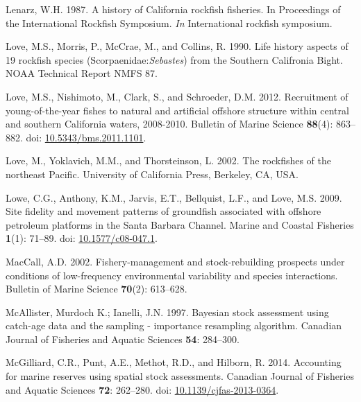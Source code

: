 \documentclass[
  english,
  a4paper,
]{article}
\newlength{\cslhangindent}
\newlength{\cslentryspacingunit} %
\newenvironment{CSLReferences}[2] %
 {%
  \setlength{\parindent}{0pt}
  \ifodd #1
  \let\oldpar\par
  \def\par{\hangindent=\cslhangindent\oldpar}
  \fi
  \setlength{\parskip}{#2\cslentryspacingunit}
 }%
 {}
\begin{document}
\begin{CSLReferences}{1}{0}
\leavevmode{}%
Lenarz, W.H. 1987. {A history of California rockfish fisheries. In Proceedings of the International Rockfish Symposium.} \emph{In} International rockfish symposium.

\leavevmode{}%
Love, M.S., Morris, P., McCrae, M., and Collins, R. 1990. {Life history aspects of 19 rockfish species (Scorpaenidae:\emph{Sebastes}) from the Southern Califronia Bight}. NOAA Technical Report NMFS 87.

\leavevmode{}%
Love, M.S., Nishimoto, M., Clark, S., and Schroeder, D.M. 2012. {Recruitment of young-of-the-year fishes to natural and artificial offshore structure within central and southern California waters, 2008-2010}. Bulletin of Marine Science \textbf{88}(4): 863--882. doi: \href{https://doi.org/10.5343/bms.2011.1101}{10.5343/bms.2011.1101}.

\leavevmode{}%
Love, M., Yoklavich, M.M., and Thorsteinson, L. 2002. {The rockfishes of the northeast Pacific}. University of California Press, Berkeley, CA, USA.

\leavevmode{}%
Lowe, C.G., Anthony, K.M., Jarvis, E.T., Bellquist, L.F., and Love, M.S. 2009. {Site fidelity and movement patterns of groundfish associated with offshore petroleum platforms in the Santa Barbara Channel}. Marine and Coastal Fisheries \textbf{1}(1): 71--89. doi: \href{https://doi.org/10.1577/c08-047.1}{10.1577/c08-047.1}.

\leavevmode{}%
MacCall, A.D. 2002. {Fishery-management and stock-rebuilding prospects under conditions of low-frequency environmental variability and species interactions}. Bulletin of Marine Science \textbf{70}(2): 613--628.

\leavevmode{}%
McAllister, Murdoch K.; Ianelli, J.N. 1997. {Bayesian stock assessment using catch-age data and the sampling - importance resampling algorithm}. Canadian Journal of Fisheries and Aquatic Sciences \textbf{54}: 284--300.

\leavevmode{}%
McGilliard, C.R., Punt, A.E., Methot, R.D., and Hilborn, R. 2014. {Accounting for marine reserves using spatial stock assessments}. Canadian Journal of Fisheries and Aquatic Sciences \textbf{72}: 262--280. doi: \href{https://doi.org/10.1139/cjfas-2013-0364}{10.1139/cjfas-2013-0364}.


\end{CSLReferences}
\end{document}
